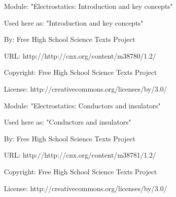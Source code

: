       \par\vspace{9pt}\noindent\begin{minipage}{\textwidth}
      Module: "Electrostatics: Introduction and key concepts" \par\nopagebreak\noindent
      Used here as: "Introduction and key concepts" \par\nopagebreak\noindent
        By: Free High School Science Texts Project\par\nopagebreak\noindent
      URL: http://http://cnx.org/content/m38780/1.2/\par\nopagebreak\noindent
      \par\nopagebreak\noindent
      Copyright: Free High School Science Texts Project\par\nopagebreak\noindent
      License:  http://creativecommons.org/licenses/by/3.0/\par\nopagebreak\noindent
      \par\end{minipage}
      \par\vspace{9pt}\noindent\begin{minipage}{\textwidth}
      Module: "Electrostatics: Conductors and insulators" \par\nopagebreak\noindent
      Used here as: "Conductors and insulators" \par\nopagebreak\noindent
        By: Free High School Science Texts Project\par\nopagebreak\noindent
      URL: http://http://cnx.org/content/m38781/1.2/\par\nopagebreak\noindent
      \par\nopagebreak\noindent
      Copyright: Free High School Science Texts Project\par\nopagebreak\noindent
      License:  http://creativecommons.org/licenses/by/3.0/\par\nopagebreak\noindent
      \par\end{minipage}
